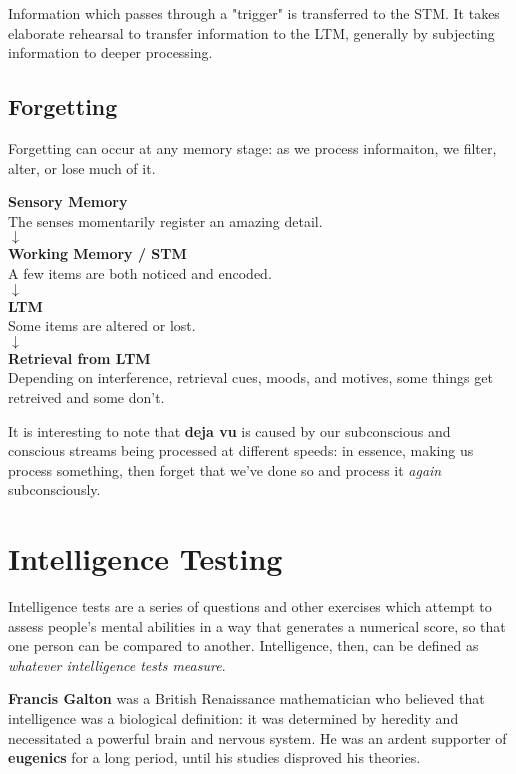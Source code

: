 \documentclass[12pt]{article}
\begin{document}
Information which passes through a "trigger" is transferred to the STM. It takes elaborate rehearsal to transfer information to the LTM, generally by subjecting information to deeper processing.

\subsection*{Forgetting}
Forgetting can occur at any memory stage: as we process informaiton, we filter, alter, or lose much of it.

\begin{center}
{\bf Sensory Memory} \\
The senses momentarily register an amazing detail. \\
$\downarrow$\\
{\bf Working Memory / STM} \\
A few items are both noticed and encoded. \\
$\downarrow$\\
{\bf LTM} \\
Some items are altered or lost. \\
$\downarrow$\\
{\bf Retrieval from LTM} \\
Depending on interference, retrieval cues, moods, and motives, some things get retreived and some don't.
\end{center}

It is interesting to note that {\bf deja vu} is caused by our subconscious and conscious streams being processed at different speeds: in essence, making us process something, then forget that we've done so and process it {\it again} subconsciously.

\section*{Intelligence Testing}
Intelligence tests are a series of questions and other exercises which attempt to assess people's mental abilities in a way that generates a numerical score, so that one person can be compared to another. Intelligence, then, can be defined as {\it whatever intelligence tests measure}.

{\bf Francis Galton} was a British Renaissance mathematician who believed that intelligence was a biological definition: it was determined by heredity and necessitated a powerful brain and nervous system. He was an ardent supporter of {\bf eugenics} for a long period, until his studies disproved his theories.
\end{document}
